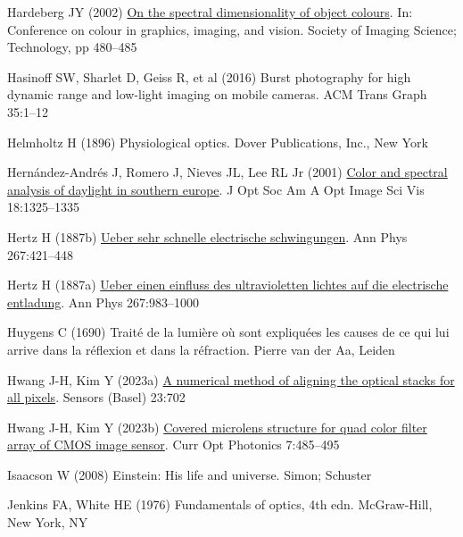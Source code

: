 \documentclass[
  letterpaper,
]{book}
\newlength{\cslhangindent}
\newenvironment{CSLReferences}[2] %
 {\begin{list}{}{%
  \setlength{\itemindent}{0pt}
  \setlength{\leftmargin}{0pt}
  \setlength{\parsep}{0pt}
  \ifodd #1
   \setlength{\leftmargin}{\cslhangindent}
   \setlength{\itemindent}{-1\cslhangindent}
  \fi
  \setlength{\itemsep}{#2\baselineskip}}}
 {\end{list}}
\begin{document}
\begin{CSLReferences}{1}{1}
Hardeberg JY (2002)
\href{https://library.imaging.org/cgiv/articles/1/1/art00101}{On the
spectral dimensionality of object colours}. In: Conference on colour in
graphics, imaging, and vision. Society of Imaging Science; Technology,
pp 480--485

Hasinoff SW, Sharlet D, Geiss R, et al (2016) Burst photography for high
dynamic range and low-light imaging on mobile cameras. ACM Trans Graph
35:1--12

Helmholtz H (1896) Physiological optics. Dover Publications, Inc., New
York

Hernández-Andrés J, Romero J, Nieves JL, Lee RL Jr (2001)
\href{https://colorimaginglab.ugr.es/pages/pdfs/josaa_2001_1325/\%21}{Color
and spectral analysis of daylight in southern europe}. J Opt Soc Am A
Opt Image Sci Vis 18:1325--1335

Hertz H (1887b) \href{http://dx.doi.org/10.1002/andp.18872670707}{Ueber
sehr schnelle electrische schwingungen}. Ann Phys 267:421--448

Hertz H (1887a) \href{http://dx.doi.org/10.1002/andp.18872670827}{Ueber
einen einfluss des ultravioletten lichtes auf die electrische
entladung}. Ann Phys 267:983--1000

Huygens C (1690) Traité de la lumière où sont expliquées les causes de
ce qui lui arrive dans la réflexion et dans la réfraction. Pierre van
der Aa, Leiden

Hwang J-H, Kim Y (2023a) \href{http://dx.doi.org/10.3390/s23020702}{A
numerical method of aligning the optical stacks for all pixels}. Sensors
(Basel) 23:702

Hwang J-H, Kim Y (2023b)
\href{http://dx.doi.org/10.1364/COPP.7.000485}{Covered microlens
structure for quad color filter array of {CMOS} image sensor}. Curr Opt
Photonics 7:485--495

Isaacson W (2008) Einstein: His life and universe. Simon; Schuster

Jenkins FA, White HE (1976) Fundamentals of optics, 4th edn.
McGraw-Hill, New York, NY


\end{CSLReferences}
\end{document}
